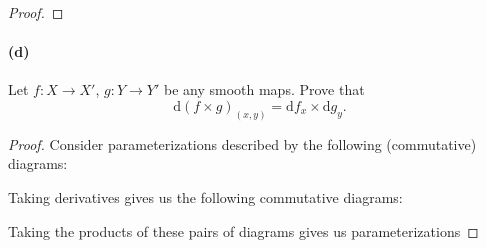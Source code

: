 \documentclass[12pt]{article}
\newlength{\myparskip}
\newenvironment{fullbox}{\begin{lrbox}{\savefullbox}\begin{minipage}{\dimexpr\textwidth-2\fboxsep\relax}\setlength{\parskip}{\myparskip}}{\end{minipage}\end{lrbox}\framebox[\textwidth]{\usebox{\savefullbox}}}
\newenvironment{pbox}[1][]{\begin{fullbox}\def\temp{#1}\ifx\temp\empty\else\paragraph{#1}\phantom{}\fi}{\end{fullbox}}
\theoremstyle{definition}
\newcommand{\R}{\mathbb{R}}
\renewcommand{\phi}{\varphi}
\newcommand{\<}{\langle}
\renewcommand{\>}{\rangle}
\newcommand{\dd}{\mathrm{d}}
\begin{document}
\begin{proof}
    
\end{proof}

\begin{pbox}[(d)]
    Let $f : X \to X'$, $g : Y \to Y'$ be any smooth maps.
    Prove that
    \[
        \dd(f \times g)_{(x, y)} = \dd{f}_x \times \dd{g}_y.
    \]
\end{pbox}

\begin{proof}
    Consider parameterizations described by the following (commutative) diagrams:
    \begin{center}
        \hspace{2em}
    \end{center}
    Taking derivatives gives us the following commutative diagrams:
    \begin{center}
        \hspace{2em}
    \end{center}
    Taking the products of these pairs of diagrams gives us parameterizations

\end{proof}
\end{document}
